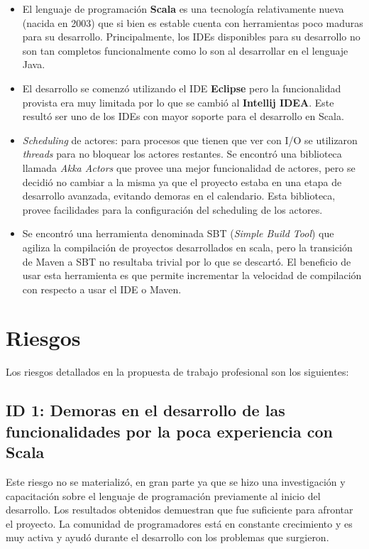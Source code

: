 \documentclass[12pt,a4paper]{article}
\begin{document}
\begin{itemize}
	\item El lenguaje de programación \textbf{Scala} es una tecnología relativamente nueva (nacida en 2003) que
	si bien es estable cuenta con herramientas poco maduras para su desarrollo. Principalmente, los IDEs disponibles
	para su desarrollo no son tan completos funcionalmente como lo son al desarrollar en el lenguaje Java.

	\item El desarrollo se comenzó utilizando el IDE \textbf{Eclipse} pero la funcionalidad provista era muy
	limitada por lo que se cambió al \textbf{Intellij IDEA}. Este resultó ser uno de los IDEs con mayor soporte
	para el desarrollo en Scala.

	\item \textit{Scheduling} de actores: para procesos que tienen que ver con I/O se utilizaron \textit{threads}
	para no bloquear los actores restantes. Se encontró una biblioteca llamada \textit{Akka Actors} que 
	provee una mejor funcionalidad de actores, pero se decidió no cambiar a la misma ya que el proyecto estaba
	en una etapa de desarrollo avanzada, evitando demoras en el calendario. Esta biblioteca, provee facilidades
	para la configuración del scheduling de los actores.

    \item Se encontró una herramienta denominada SBT (\textit{Simple Build Tool}) que agiliza la compilación
    de proyectos desarrollados en scala, pero la transición de Maven a SBT no resultaba trivial por lo que
    se descartó. El beneficio de usar esta herramienta es que permite incrementar la velocidad de compilación
    con respecto a usar el IDE o Maven.
    
\end{itemize}

\section{Riesgos}

Los riesgos detallados en la propuesta de trabajo profesional son los siguientes:

\subsection{ID 1: Demoras en el desarrollo de las funcionalidades por la poca experiencia con Scala}
Este riesgo no se materializó, en gran parte ya que se hizo una investigación y capacitación sobre el lenguaje de
programación previamente al inicio del desarrollo. Los resultados obtenidos demuestran que fue suficiente
para afrontar el proyecto. La comunidad de programadores está en constante crecimiento y es muy activa y ayudó
durante el desarrollo con los problemas que surgieron.
\end{document}
